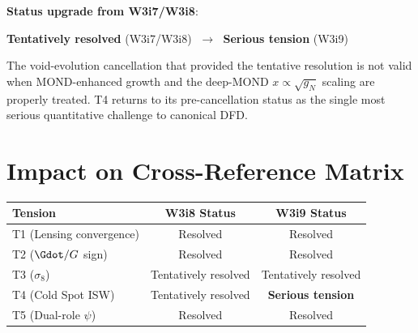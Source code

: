 \documentclass[11pt,a4paper]{article}
\begin{document}
\begin{tcolorbox}[colback=yellow!5!white, colframe=red!60!black,
  title=\textbf{W3i9 Final T4 Summary}]
\textbf{Status upgrade from W3i7/W3i8}:
\begin{center}
\textcolor{green!50!black}{\textbf{Tentatively resolved} (W3i7/W3i8)}
$\;\longrightarrow\;$
\textcolor{red!60!black}{\textbf{Serious tension} (W3i9)}
\end{center}

The void-evolution cancellation that provided the tentative resolution
is not valid when MOND-enhanced growth and the deep-MOND $x \propto
\sqrt{g_N}$ scaling are properly treated. T4 returns to its
pre-cancellation status as the single most serious quantitative
challenge to canonical DFD.

\end{tcolorbox}


\section{Impact on Cross-Reference Matrix}

\begin{center}
\begin{tabular}{lcc}
\toprule
\textbf{Tension} & \textbf{W3i8 Status} & \textbf{W3i9 Status} \\
\midrule
T1 (Lensing convergence) & \textcolor{green!50!black}{Resolved} &
  \textcolor{green!50!black}{Resolved} \\
T2 ($\Gdot/G$ sign) & \textcolor{green!50!black}{Resolved} &
  \textcolor{green!50!black}{Resolved} \\
T3 ($\sigma_8$) & \textcolor{green!50!black}{Tentatively resolved} &
  \textcolor{green!50!black}{Tentatively resolved} \\
T4 (Cold Spot ISW) & \textcolor{green!50!black}{Tentatively resolved} &
  \textcolor{red!60!black}{\textbf{Serious tension}} \\
T5 (Dual-role $\psi$) & \textcolor{green!50!black}{Resolved} &
  \textcolor{green!50!black}{Resolved} \\
\bottomrule
\end{tabular}
\end{center}
\end{document}
